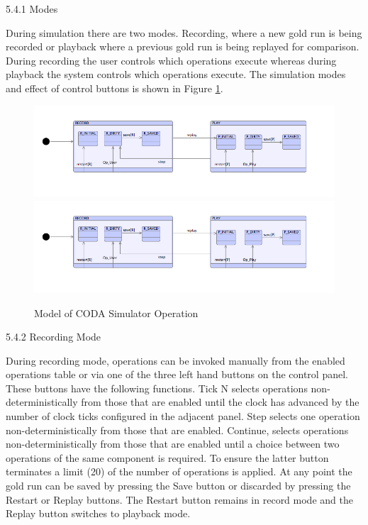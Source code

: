 5.4.1	Modes

During simulation there are two modes. Recording, where a new gold run is being recorded or playback where a previous gold run is being replayed for comparison. During recording the user controls which operations execute whereas during playback the system controls which operations execute.  The simulation modes and effect of control buttons is shown in Figure \ref{fig:ModelOfCODASimulatorOperation}.

 \begin{figure}[!htbp]
  \centering
  \ifplastex
  \includegraphics[width=1024]{figures/image12.png}
  \else
  \includegraphics[width=1\textwidth]{figures/image12.png}
  \fi
  \caption{Model of CODA Simulator Operation}
  \label{fig:ModelOfCODASimulatorOperation}
\end{figure} 

5.4.2	Recording Mode

During recording mode, operations can be invoked manually from the enabled operations table or via one of the three left hand buttons on the control panel. These buttons have the following functions. Tick N selects operations non-deterministically from those that are enabled until the clock has advanced by the number of clock ticks configured in the adjacent panel. Step selects one operation non-deterministically from those that are enabled. Continue, selects operations non-deterministically from those that are enabled until a choice between two operations of the same component is required. To ensure the latter button terminates a limit (20) of the number of operations is applied. 
At any point the gold run can be saved by pressing the Save button or discarded by pressing the Restart or Replay buttons. The Restart button remains in record mode and the Replay button switches to playback mode.

